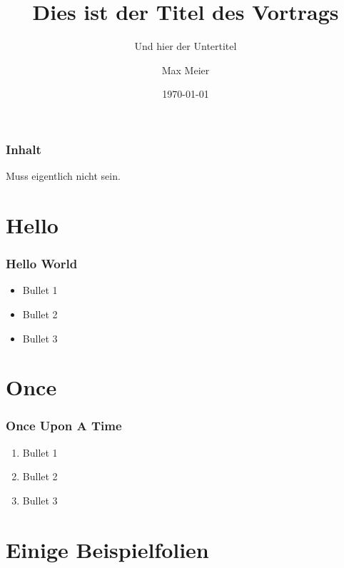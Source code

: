 \documentclass[utf8]{beamer}
\begin{document}
\title[Kurztitel]{Dies ist der Titel des Vortrags}
\subtitle{Und hier der Untertitel}
\author{Max Meier}
\date{\today}

\begin{frame}
	\titlepage
\end{frame}

\begin{frame}\frametitle{Inhalt}

Muss eigentlich nicht sein.

	\tableofcontents[pausesections]

\end{frame}

\section{Hello}

\begin{frame}\frametitle{Hello World}

\begin{itemize}

	\item Bullet 1
	\pause
	\item Bullet 2
	\pause
	\item Bullet 3

\end{itemize}

\end{frame}

\section{Once}

\begin{frame}\frametitle{Once Upon A Time}

\begin{enumerate}

	\item Bullet 1
	\pause
	\item Bullet 2
	\pause
	\item Bullet 3

\end{enumerate}

\end{frame}

\section{Einige Beispielfolien}
\end{document}
